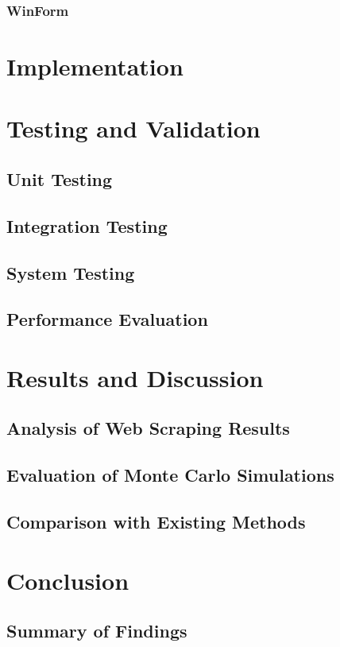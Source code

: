 \documentclass{thesis-ekf}
\theoremstyle{definition}
\theoremstyle{remark}
\begin{document}
{\subsection{WinForm}








\chapter{Implementation}

\chapter{Testing and Validation}
\section{Unit Testing}
\section{Integration Testing}
\section{System Testing}
\section{Performance Evaluation}

\chapter{Results and Discussion}
\section{Analysis of Web Scraping Results}
\section{Evaluation of Monte Carlo Simulations}
\section{Comparison with Existing Methods}

\chapter{Conclusion}
\section{Summary of Findings}
}
\end{document}
